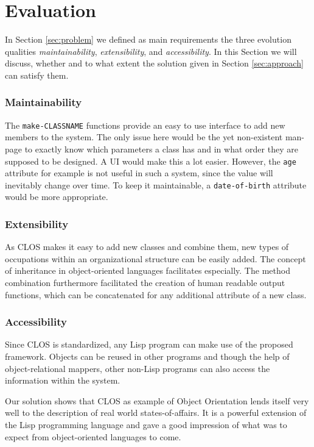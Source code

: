 \documentclass[oribibl]{llncs}
\begin{document}
\section{Evaluation}
\label{sec:evaluation}

In Section \ref{sec:problem} we defined as main requirements the three evolution qualities \emph{maintainability}, \emph{extensibility}, and \emph{accessibility}. In this Section we will discuss, whether and to what extent the solution given in Section \ref{sec:approach} can satisfy them.

\subsubsection{Maintainability}
The \texttt{make-CLASSNAME} functions provide an easy to use interface to add new members to the system. The only issue here would be the yet non-existent man-page to exactly know which parameters a class has and in what order they are supposed to be designed. A UI would make this a lot easier. However, the \texttt{age} attribute for example is not useful in such a system, since the value will inevitably change over time. To keep it maintainable, a \texttt{date-of-birth} attribute would be more appropriate. 

\subsubsection{Extensibility} 
As CLOS makes it easy to add new classes and combine them, new types of occupations within an organizational structure can be easily added. The concept of inheritance in object-oriented languages facilitates especially. The method combination furthermore facilitated the creation of human readable output functions, which can be concatenated for any additional attribute of a new class. 

\subsubsection{Accessibility}
Since CLOS is standardized, any Lisp program can make use of the proposed framework. Objects can be reused in other programs and though the help of object-relational mappers, other non-Lisp programs can also access the information within the system.
\newline

Our solution shows that CLOS as example of Object Orientation lends itself very well to the description of real world states-of-affairs. It is a powerful extension of the Lisp programming language and gave a good impression of what was to expect from object-oriented languages to come.
\end{document}
